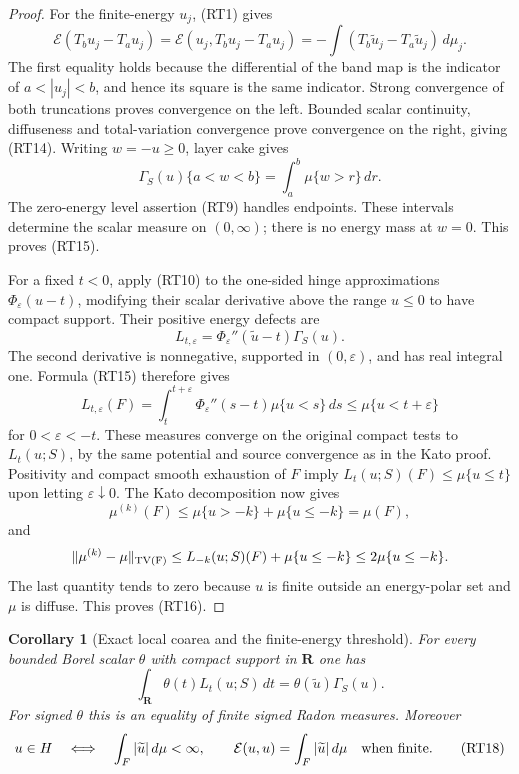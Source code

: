 \documentclass[11pt,a4paper]{article}
\numberwithin{equation}{section}
\newtheorem{corollary}[theorem]{Corollary}
\theoremstyle{definition}
\theoremstyle{remark}
\begin{document}
\begin{proof}
For the finite-energy $u_j$, (RT1) gives
\[
 \mathcal E(T_bu_j-T_au_j)
  =\mathcal E(u_j,T_bu_j-T_au_j)
  =-\int(T_b\widetilde u_j-T_a\widetilde u_j)\,d\mu_j.
\]
The first equality holds because the differential of the band
map is the indicator of $a<|u_j|<b$, and hence its square
is the same indicator.  Strong convergence of both
truncations proves convergence on the left.  Bounded scalar
continuity, diffuseness and total-variation convergence prove
convergence on the right, giving (RT14).
Writing $w=-u\ge0$, layer cake gives
\[
 \Gamma_S(u)\{a<w<b\}
       =\int_a^b\mu\{w>r\}\,dr.
\]
The zero-energy level assertion (RT9) handles endpoints.
These intervals determine the scalar measure on $(0,\infty)$;
there is no energy mass at $w=0$.  This proves (RT15).

For a fixed $t<0$, apply (RT10) to the one-sided hinge
approximations $\Phi_\varepsilon(u-t)$, modifying their
scalar derivative above the range $u\le0$ to have compact
support.  Their positive energy defects are
\[
       L_{t,\varepsilon}
         =\Phi_\varepsilon''(\widetilde u-t)\Gamma_S(u).
\]
The second derivative is nonnegative, supported in $(0,\varepsilon)$,
and has real integral one.  Formula (RT15) therefore gives
\[
 L_{t,\varepsilon}(F)
   =\int_t^{t+\varepsilon}
        \Phi_\varepsilon''(s-t)\mu\{u<s\}\,ds
   \le\mu\{u<t+\varepsilon\}
\]
for $0<\varepsilon<-t$.
These measures converge on the original compact tests to
$L_t(u;S)$, by the same potential and source convergence as
in the Kato proof.  Positivity and compact smooth exhaustion
of $F$ imply
$L_t(u;S)(F)\le\mu\{u\le t\}$ upon letting
$\varepsilon\downarrow0$.
The Kato decomposition now gives
\[
 \mu^{(k)}(F)
  \le\mu\{u>-k\}+\mu\{u\le-k\}=\mu(F),
\]
and
\[
 \|\mu^{(k)}-\mu\|_{\rm TV(F)}
   \le L_{-k}(u;S)(F)+\mu\{u\le-k\}
   \le2\mu\{u\le-k\}.
\]
The last quantity tends to zero because $u$ is finite outside
an energy-polar set and $\mu$ is diffuse.  This proves (RT16).
\end{proof}

\begin{corollary}[Exact local coarea and the finite-energy threshold]
\label{cor:r11-positive-diffuse-coarea-threshold}
For every bounded Borel scalar $\theta$ with compact support
in $\mathbf R$ one has
\[
           \int_{\mathbf R}\theta(t)L_t(u;S)\,dt
                     =\theta(\widetilde u)\Gamma_S(u).
 \tag{RT17}
\]
For signed $\theta$ this is an equality of finite signed
Radon measures.  Moreover
\[
       u\in H\quad\Longleftrightarrow\quad
                     \int_F|\widetilde u|\,d\mu<\infty,
 \qquad
       \mathcal E(u,u)=\int_F|\widetilde u|\,d\mu
                        \quad\hbox{when finite}.
 \tag{RT18}
\]
\end{corollary}
\end{document}
